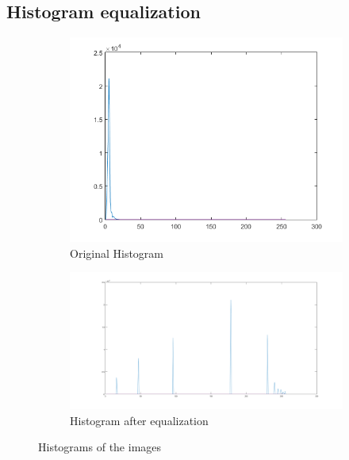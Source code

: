 \documentclass[a4paper,16pt]{article}
\begin{document}
	\subsection{Histogram equalization}
	\vspace{0.3in}
	
	\newpage
	
	\begin{figure}[h!]
		\begin{subfigure}[h]{0.62\linewidth}
			\includegraphics[width=0.82\linewidth,scale=0.3,height=0.5\linewidth]{hist1}
			\caption{Original Histogram}
		\end{subfigure}
		\begin{subfigure}[h]{0.62\linewidth}
			\includegraphics[scale=0.4,width=0.8\linewidth,height=0.5\linewidth]{hist2}
			\caption{Histogram after equalization}
		\end{subfigure}%
		\caption{Histograms of the images}
	\end{figure}
\end{document}
